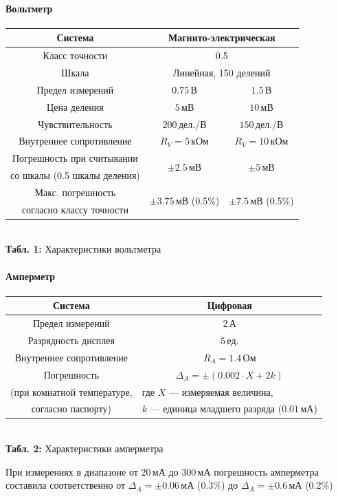 \documentclass[12pt,a4paper]{scrartcl}
\begin{document}
	\paragraph{Вольтметр} \hfill
	\begin{center}
		\begin{tabular}{|c|c|c|}
			\hline Система & \multicolumn{2}{|c|}{Магнито-электрическая}
			\\\hline Класс точности & \multicolumn{2}{|c|}{0.5}
			\\\hline Шкала & \multicolumn{2}{|c|}{Линейная, 150 делений}
			\\\hline Предел измерений & $0.75\,$В & $1.5\,$В
			\\\hline Цена деления & $5\,$мВ & $10\,$мВ
			\\\hline Чувствительность & $200\,$дел./В & $150\,$дел./В
			\\\hline Внутреннее сопротивление & $R_V = 5\,$кОм & $R_V = 10\,$кОм
			\\\hline Погрешность при считывании & \multirow{2}{*}{$\pm 2.5\,$мВ} & \multirow{2}{*}{$\pm 5\,$мВ}
			\\ со шкалы (0.5 шкалы деления) &&
			\\\hline Макс. погрешность & \multirow{2}{*}{$\pm 3.75\,$мВ (0.5\%)} & \multirow{2}{*}{$\pm 7.5\,$мВ (0.5\%)}
			\\ согласно классу точности &&
			\\\hline
		\end{tabular}
		\\\textbf{Табл. 1:} Характеристики вольтметра
	\end{center}

	\paragraph{Амперметр} \hfill
	
	\begin{center}
		\begin{tabular}{|c|c|}
			\hline Система & Цифровая
			\\\hline Предел измерений & $2\,$А
			\\\hline Разрядность дисплея & $5\,$ед.
			\\\hline Внутреннее сопротивление & $R_A = 1.4\,$Ом
			\\\hline Погрешность & $\Delta_A = \pm(0.002 \cdot X + 2k)$
			\\ (при комнатной температуре, & \multicolumn{1}{|l|}{где $X$ --- измеряемая величина,}
			\\ согласно паспорту) & \multicolumn{1}{|l|}{$k$ --- единица младшего разряда ($0.01\,$мА)}
			\\\hline
		\end{tabular}
		\\\textbf{Табл. 2:} Характеристики амперметра
	\end{center}
	\vspace{-0.3cm}При измерениях в диапазоне от $20\,$мА до $300\,$мА погрешность амперметра составила соответственно от $\Delta_A = \pm 0.06\,$мА (0.3\%) до $\Delta_A = \pm 0.6\,$мА (0.2\%)
	
\end{document}
